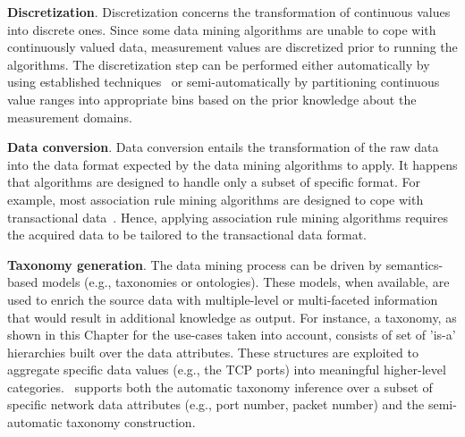 \textbf{Discretization}. Discretization concerns the transformation of continuous values into discrete ones. Since some data mining algorithms are unable to cope with continuously valued data, 
measurement values are discretized prior to running the algorithms. 
The discretization step can be performed either automatically by using established techniques~\cite{libroKumar} or semi-automatically by partitioning continuous value ranges into appropriate bins based on the prior knowledge about the measurement domains. 

\textbf{Data conversion}. Data conversion entails the transformation of the raw data into the data format expected by the data mining algorithms to apply. It happens that algorithms are designed to handle only a subset of specific format. For example, most association rule mining algorithms are designed to cope with transactional data~\cite{libroKumar}. Hence, applying association rule mining algorithms requires the acquired data to be tailored to the transactional data format. 

\textbf{Taxonomy generation}. The data mining process can be driven by semantics-based models (e.g., taxonomies or ontologies). These models, when available, are used to enrich the source data with multiple-level or multi-faceted information that would result in additional knowledge as output.  
For instance, a taxonomy, as shown in this Chapter for the use-cases taken into account, consists of set of 'is-a' hierarchies built over the data attributes. These structures are exploited to aggregate specific data values (e.g., the TCP ports) into meaningful higher-level categories.
\Nemico\ supports both
the automatic taxonomy inference over a subset of specific network data attributes (e.g., port number, packet number) 
and the semi-automatic taxonomy construction. 

